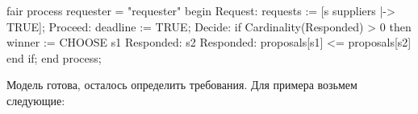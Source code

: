 \documentclass[14pt, openany]{report}
\begin{document}
\begin{ppcal}
  fair process requester = "requester"
  begin
  Request:
    requests := [s \in suppliers |-> TRUE];
  Proceed:
    deadline := TRUE;
  Decide:                  
    if Cardinality(Responded) > 0 then
      winner := 
        CHOOSE s1 \in Responded: 
        \A s2 \in Responded: 
        proposals[s1] <= proposals[s2]
    end if;
  end process;
\end{ppcal}
\begin{tlatex}
%
%
%
%
%
%
%
%
%
%
%
%
%
\end{tlatex}

Модель готова, осталось определить требования. Для примера возьмем следующие:
\end{document}

